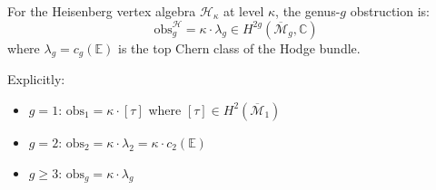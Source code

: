 \begin{theorem}\label{thm:heisenberg-obs}
For the Heisenberg vertex algebra $\mathcal{H}_\kappa$ at level $\kappa$, the 
genus-$g$ obstruction is:
\begin{equation}
\text{obs}_g^{\mathcal{H}} = \kappa \cdot \lambda_g \in H^{2g}(\overline{\mathcal{M}}_g, \mathbb{C})
\end{equation}
where $\lambda_g = c_g(\mathbb{E})$ is the top Chern class of the Hodge bundle.

Explicitly:
\begin{itemize}
\item $g=1$: $\text{obs}_1 = \kappa \cdot [\tau]$ where $[\tau] \in H^2(\overline{\mathcal{M}}_1)$
\item $g=2$: $\text{obs}_2 = \kappa \cdot \lambda_2 = \kappa \cdot c_2(\mathbb{E})$
\item $g \geq 3$: $\text{obs}_g = \kappa \cdot \lambda_g$
\end{itemize}
\end{theorem}

